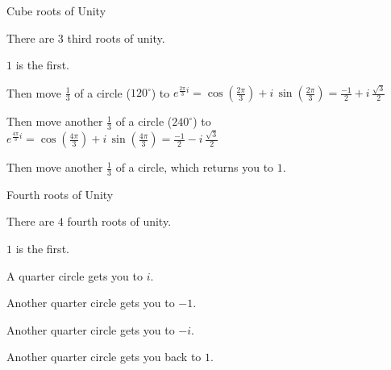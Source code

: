 \documentclass{ximera}
\begin{document}
\begin{example}  Cube roots of Unity

There are $3$ third roots of unity.

$1$ is the first.

Then move $\frac{1}{3}$ of a circle ($120^{\circ}$) to $e^{\tfrac{2 \pi}{3} i} = \cos\left(\frac{2 \pi}{3}\right) + i \, \sin\left(\frac{2 \pi}{3}\right) = \frac{-1}{2} + i \, \frac{\sqrt{3}}{2}$

Then move another $\frac{1}{3}$ of a circle ($240^{\circ}$) to $e^{\tfrac{4 \pi}{3} i} = \cos\left(\frac{4 \pi}{3}\right) + i \, \sin\left(\frac{4 \pi}{3}\right) = \frac{-1}{2} - i \, \frac{\sqrt{3}}{2}$



Then move another $\frac{1}{3}$ of a circle, which returns you to $1$.




\end{example}











\begin{example}  Fourth roots of Unity

There are $4$ fourth roots of unity.

$1$ is the first.

A quarter circle gets you to $i$. 

Another quarter circle gets you to $-1$. 

Another quarter circle gets you to $-i$. 

Another quarter circle gets you back to $1$.


\end{example}
\end{document}

